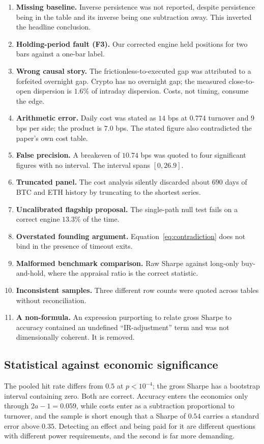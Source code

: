 \documentclass[preprint,12pt,authoryear]{elsarticle}
\begin{document}
\begin{enumerate}
\item \textbf{Missing baseline.} Inverse persistence was not reported, despite
persistence being in the table and its inverse being one subtraction away. This
inverted the headline conclusion.
\item \textbf{Holding-period fault (F3).} Our corrected engine held positions for
two bars against a one-bar label.
\item \textbf{Wrong causal story.} The frictionless-to-executed gap was
attributed to a forfeited overnight gap. Crypto has no overnight gap; the
measured close-to-open dispersion is $1.6\%$ of intraday dispersion. Costs, not
timing, consume the edge.
\item \textbf{Arithmetic error.} Daily cost was stated as $14$ bps at $0.774$
turnover and $9$ bps per side; the product is $7.0$ bps. The stated figure also
contradicted the paper's own cost table.
\item \textbf{False precision.} A breakeven of $10.74$ bps was quoted to four
significant figures with no interval. The interval spans $[0, 26.9]$.
\item \textbf{Truncated panel.} The cost analysis silently discarded about $690$
days of BTC and ETH history by truncating to the shortest series.
\item \textbf{Uncalibrated flagship proposal.} The single-path null test fails on
a correct engine $13.3\%$ of the time.
\item \textbf{Overstated founding argument.} Equation~\eqref{eq:contradiction}
does not bind in the presence of timeout exits.
\item \textbf{Malformed benchmark comparison.} Raw Sharpe against long-only
buy-and-hold, where the appraisal ratio is the correct statistic.
\item \textbf{Inconsistent samples.} Three different row counts were quoted
across tables without reconciliation.
\item \textbf{A non-formula.} An expression purporting to relate gross Sharpe to
accuracy contained an undefined ``IR-adjustment'' term and was not dimensionally
coherent. It is removed.
\end{enumerate}

\subsection{Statistical against economic significance}

The pooled hit rate differs from $0.5$ at $p < 10^{-4}$; the gross Sharpe has a
bootstrap interval containing zero. Both are correct. Accuracy enters the
economics only through $2a - 1 = 0.059$, while costs enter as a subtraction
proportional to turnover, and the sample is short enough that a Sharpe of $0.54$
carries a standard error above $0.35$. Detecting an effect and being paid for it
are different questions with different power requirements, and the second is far
more demanding.
\end{document}
